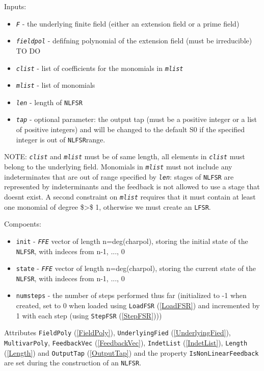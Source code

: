 \documentclass[a4paper,11pt]{report}
\begin{document}
{{{ Inputs: 
\begin{itemize}
\item  \mbox{\texttt{\mdseries\slshape F}} - the underlying finite field (either an extension field or a prime field)
\item  \mbox{\texttt{\mdseries\slshape fieldpol}} - defifning polynomial of the extension field (must be irreducible) TO DO 
\item  \mbox{\texttt{\mdseries\slshape clist}} - list of coefficients for the monomials in \mbox{\texttt{\mdseries\slshape mlist}} 
\item  \mbox{\texttt{\mdseries\slshape mlist}} - list of monomials 
\item  \mbox{\texttt{\mdseries\slshape len}} - length of \texttt{NLFSR} 
\item  \mbox{\texttt{\mdseries\slshape tap}} - optional parameter: the output tap (must be a positive integer or a list of
positive integers) and will be changed to the default S{\textunderscore}0 if
the specified integer is out of \texttt{NLFSR}range.
\end{itemize}
 NOTE: \mbox{\texttt{\mdseries\slshape clist}} and \mbox{\texttt{\mdseries\slshape mlist}} must be of same length, all elements in \mbox{\texttt{\mdseries\slshape clist}} must belong to the underlying field. Monomials in \mbox{\texttt{\mdseries\slshape mlist}} must not include any indeterminates that are out of range specified by \mbox{\texttt{\mdseries\slshape len}}: stages of \texttt{NLFSR} are represented by indeterminants and the feedback is not allowed to use a
stage that doesnt exist. A second constraint on \mbox{\texttt{\mdseries\slshape mlist}} requires that it must contain at least one monomial of degree
\${\textgreater}\$ 1, otherwise we must create an \texttt{LFSR}. 

 Compoents: 
\begin{itemize}
\item  \texttt{init} - \mbox{\texttt{\mdseries\slshape FFE}} vector of length n=deg(charpol), storing the initial state of the \texttt{NLFSR}, with indeces from n-1, ..., 0
\item  \texttt{state} - \mbox{\texttt{\mdseries\slshape FFE}} vector of length n=deg(charpol), storing the current state of the \texttt{NLFSR}, with indeces from n-1, ..., 0
\item  \texttt{numsteps} - the number of steps performed thus far (initialized to -1 when created, set
to 0 when loaded using \texttt{LoadFSR} (\ref{LoadFSR}) and incremented by 1 with each step (using \texttt{StepFSR} (\ref{StepFSR}))) 
\end{itemize}
 Attributes \texttt{FieldPoly} (\ref{FieldPoly}), \texttt{UnderlyingFied} (\ref{UnderlyingFied}), \texttt{MultivarPoly}, \texttt{FeedbackVec} (\ref{FeedbackVec}), \texttt{IndetList} (\ref{IndetList}), \texttt{Length} (\ref{Length}) and \texttt{OutputTap} (\ref{OutputTap}) and the property \texttt{IsNonLinearFeedback} are set during the construction of an \texttt{NLFSR}. 

}}}
\end{document}
